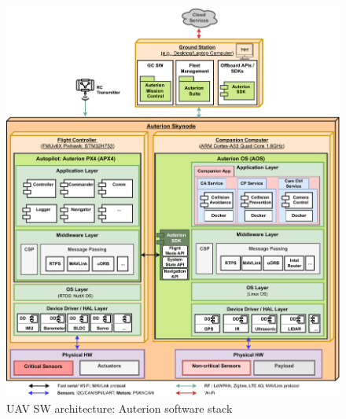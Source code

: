 \begin{figure}[!hbt]
  \centering
  \includegraphics[width=1.0\textwidth]{./img/pdf/uav-main-sw-arch-auterion.pdf} 
%   
  \caption{UAV SW architecture: Auterion software stack}%
  \label{fig:uav-sw-arch-auterion}
\end{figure}

